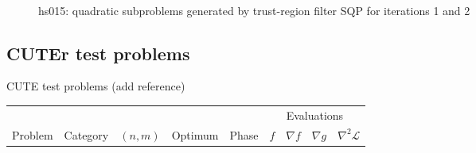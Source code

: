 \begin{figure}[htp]
  \centering
  \\
  \hspace{5pt}
  \caption{hs015: quadratic subproblems generated by trust-region filter SQP for iterations 1 and 2}
\end{figure}

\subsection{CUTEr test problems}

%

\renewcommand{\arraystretch}{1.2}

CUTE test problems (add reference)

\begin{longtable}{lll|ll|llll}
\hline
		&			& 	&		&		& \multicolumn{4}{c}{Evaluations} \\
Problem & Category & $(n, m)$ & Optimum & Phase & $f$ & $\nabla f$ & $\nabla g$ & $\nabla^2 \mathcal{L}$ \\
\hline
\hline
\end{longtable}

\clearpage
